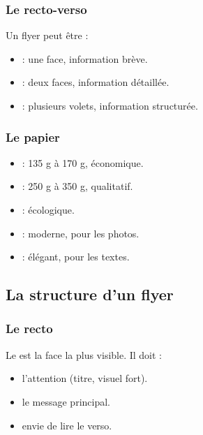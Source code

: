 \subsubsection{Le recto-verso}

Un flyer peut être :

\begin{itemize}
    \item {} : une face, information brève.
    \item {} : deux faces, information détaillée.
    \item {} : plusieurs volets, information structurée.
\end{itemize}

\subsubsection{Le papier}

\begin{itemize}
    \item {} : 135 g à 170 g, économique.
    \item {} : 250 g à 350 g, qualitatif.
    \item {} : écologique.
    \item {} : moderne, pour les photos.
    \item {} : élégant, pour les textes.
\end{itemize}

\subsection{La structure d'un flyer}

\subsubsection{Le recto}

Le  est la face la plus visible. Il doit :

\begin{itemize}
    \item {} l'attention (titre, visuel fort).
    \item {} le message principal.
    \item {} envie de lire le verso.
\end{itemize}

